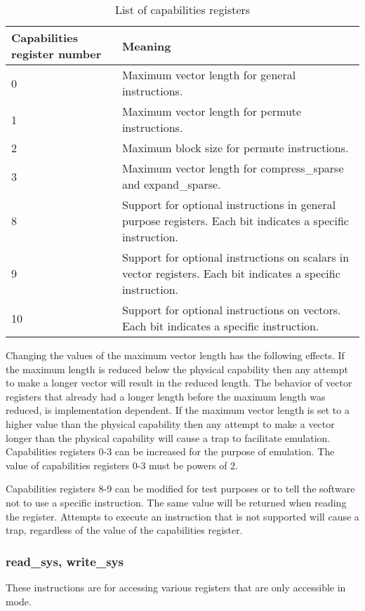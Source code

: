 \documentclass[forwardcom.tex]{subfiles}
\begin{document}
\begin{longtable} {|p{20mm}|p{90mm}|}
\caption{List of capabilities registers} 
\label{table:capabilitiesRegisters} \\
\endfirsthead
\endhead
\hline
\bfseries Capabilities register number & \bfseries Meaning  \\
\hline
0  &  Maximum vector length for general instructions. \\
\hline
1  &  Maximum vector length for permute instructions. \\
\hline
2  &  Maximum block size for permute instructions. \\
\hline
3  &  Maximum vector length for compress\_sparse and expand\_sparse. \\
\hline
8  &  Support for optional instructions in general purpose registers. Each bit indicates a specific instruction. \\
\hline
9  &  Support for optional instructions on scalars in vector registers. Each bit indicates a specific instruction. \\
\hline
10 &  Support for optional instructions on vectors. Each bit indicates a specific instruction. \\
\hline
\end{longtable}

Changing the values of the maximum vector length has the following effects. If the maximum length is reduced below the physical capability then any attempt to make a longer vector will result in the reduced length. The behavior of vector registers that already had a longer length before the maximum length was reduced, is implementation dependent. If the maximum vector length is set to a higher value than the physical capability then any attempt to make a vector longer than the physical capability will cause a trap to facilitate emulation. Capabilities registers 0-3 can be increased for the purpose of emulation. The value of capabilities registers 0-3 must be powers of 2.
\vspace{2mm}

Capabilities registers 8-9 can be modified for test purposes or to tell the software not to use a specific instruction. The same value will be returned when reading the register. Attempts to execute an instruction that is not supported will cause a trap, regardless of the value of the capabilities register.

\subsubsection{read\_sys, write\_sys}
These instructions are for accessing various registers that are only accessible in mode.
\end{document}

